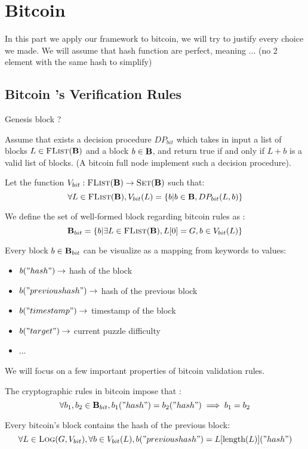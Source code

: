 

\section{Bitcoin}
In this part we apply our framework to bitcoin, we will try to justify every choice we made. 
We will assume that hash function are perfect, meaning ... (no 2 element with the same hash to simplify)

\subsection{Bitcoin 's Verification Rules}
Genesis block ?

Assume that exists a decision procedure $DP_{bit}$ which takes in input a list of blocks $L \in \text{\sc FList}(\text{\bf B})$ and a block $b \in \text{\bf B}$, and return true if and only if $L+b$ is a valid list of blocks. (A bitcoin full node implement such a decision procedure).

Let the function $V_{bit} : \text{\sc FList}(\text{\bf B}) \rightarrow \text{\sc Set}(\text{\bf B})$ such that:
$$\forall L \in \text{\sc FList}(\text{\bf B}), V_{bit}(L) = \{ b | b \in \text{\bf B}, DP_{bit}(L,b) \}$$

We define the set of well-formed block regarding bitcoin rules as : 
$$\text{\bf B}_{bit} = \{b| \exists L \in \text{\sc FList}(\text{\bf B}), L[0] = G, b \in V_{bit}(L) \}$$

\begin{mylem*}
	Every block $b \in \text{\bf B}_{bit}$ can be visualize as a mapping from keywords to values: 
	\begin{itemize}
		\item $b("hash") \rightarrow$ hash of the block
		\item $b("previous hash") \rightarrow$ hash of the previous block
		\item $b("timestamp") \rightarrow$ timestamp of the block
		\item $b("target") \rightarrow$ current puzzle difficulty
		\item ...
	\end{itemize}
\end{mylem*}

We will focus on a few important properties of bitcoin validation rules.
\begin{mylem*}
	The cryptographic rules in bitcoin impose that :
	$$ \forall b_1,b_2 \in \text{\bf B}_{bit}, b_1("hash")=b_2("hash") \implies b_1 = b_2 $$
\end{mylem*}

\begin{mylem*}
	Every bitcoin's block contains the hash of the previous block:
	$$\forall L \in \text{\sc Log}(G,V_{bit}), \forall b \in V_{bit}(L),b("previous hash") = L[\text{\rm length}(L)]("hash") $$
\end{mylem*}


